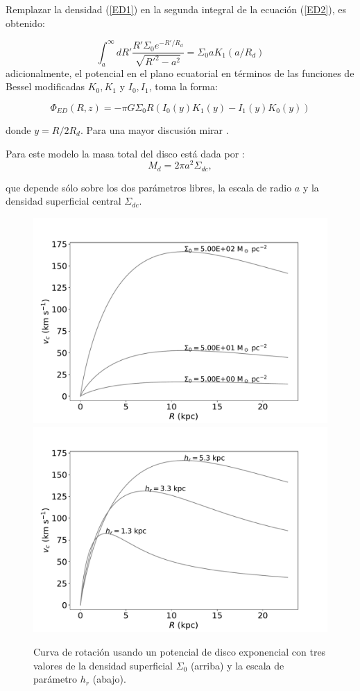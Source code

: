 Remplazar la densidad (\ref{ED1}) en la segunda integral de la ecuación (\ref{ED2}), es obtenido:

$$\int_a^{\infty} dR' \frac{R' \Sigma_0 e^{-R'/R_d}}{\sqrt{R'^2 - a^2} } = \Sigma_0 a K_1 (a/R_d)$$
adicionalmente, el potencial en el plano ecuatorial en términos de las funciones de Bessel modificadas $K_0, K_1$ y $I_0, I_1$, toma la forma:

\begin{equation}
\label{ED3}
\Phi_{ED}(R,z) = -\pi G\Sigma_0 R \left ( I_0(y)K_1(y) - I_1(y)K_0(y) \right )
\end{equation}

donde $y=R/2R_d$. Para una mayor discusión mirar \cite{Freeman, BT, C93}.

Para este modelo la masa total del disco está dada por \cite{Freeman}:
\begin{equation}
\label{massdisc}
M_d = 2\pi a^2 \Sigma_{dc},
\end{equation}

que depende sólo sobre los dos parámetros libres, la escala de radio $a$ y la densidad superficial central $\Sigma_{dc}$.\\

\begin{figure}
  \centering
    \includegraphics[width=0.8\columnwidth]{Kap2/ED_Amp.pdf}
    \includegraphics[width=0.8\columnwidth]{Kap2/ED_hr.pdf}
  \caption{ Curva de rotación usando un potencial de disco exponencial con tres valores de la densidad superficial $\Sigma_0$ (arriba) y la escala de parámetro $h_r$ (abajo).}
  \label{fig:Fig_ED_parameters}
\end{figure}

